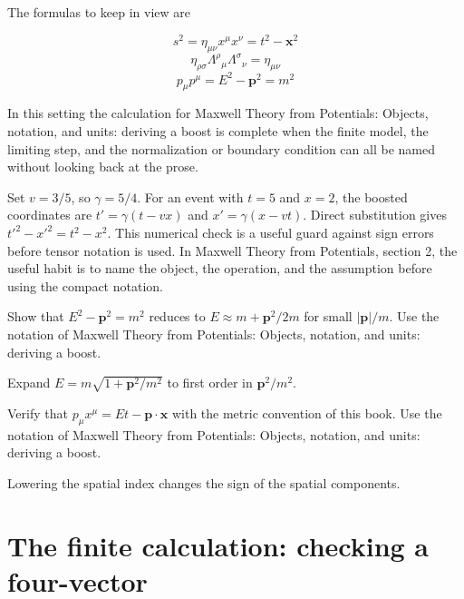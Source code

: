The formulas to keep in view are

\[
  s^2=\eta_{\mu\nu}x^\mu x^\nu=t^2-\bm x^2
\]
\[
  \eta_{\rho\sigma}\Lambda^\rho{}_\mu\Lambda^\sigma{}_\nu=\eta_{\mu\nu}
\]
\[
  p_\mu p^\mu=E^2-\bm p^2=m^2
\]

In this setting the calculation for Maxwell Theory from Potentials: Objects, notation, and units: deriving a boost is complete when the finite model, the limiting step, and the normalization or boundary condition can all be named without looking back at the prose.




\begin{example}
Set \(v=3/5\), so \(\gamma=5/4\).  For an event with \(t=5\) and \(x=2\), the boosted coordinates are \(t'=\gamma(t-vx)\) and \(x'=\gamma(x-vt)\).  Direct substitution gives \(t'^2-x'^2=t^2-x^2\).  This numerical check is a useful guard against sign errors before tensor notation is used.  In Maxwell Theory from Potentials, section 2, the useful habit is to name the object, the operation, and the assumption before using the compact notation.
\end{example}



\begin{exercise}
Show that \(E^2-\bm p^2=m^2\) reduces to \(E\approx m+\bm p^2/2m\) for small \(|\bm p|/m\).  Use the notation of Maxwell Theory from Potentials: Objects, notation, and units: deriving a boost.
\begin{answer}
Expand \(E=m\sqrt{1+\bm p^2/m^2}\) to first order in \(\bm p^2/m^2\).
\end{answer}
\end{exercise}

\begin{exercise}
Verify that \(p_\mu x^\mu=Et-\bm p\cdot\bm x\) with the metric convention of this book.  Use the notation of Maxwell Theory from Potentials: Objects, notation, and units: deriving a boost.
\begin{answer}
Lowering the spatial index changes the sign of the spatial components.
\end{answer}
\end{exercise}



\section{The finite calculation: checking a four-vector}

